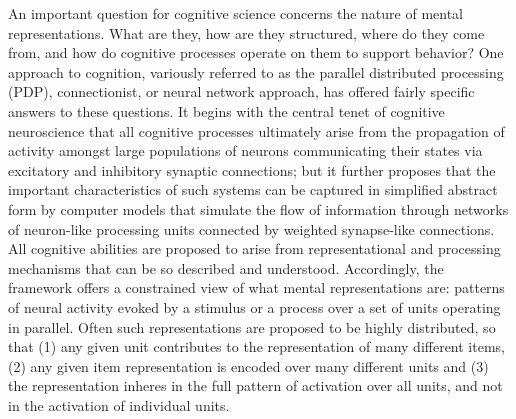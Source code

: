 An important question for cognitive science concerns the nature of mental representations. What are they, how are they structured, where do they come from, and how do cognitive processes operate on them to support behavior? One approach to cognition, variously referred to as the parallel distributed processing (PDP), connectionist, or neural network approach, has offered fairly specific answers to these questions. It begins with the central tenet of cognitive neuroscience that all cognitive processes ultimately arise from the propagation of activity amongst large populations of neurons communicating their states via excitatory and inhibitory synaptic connections; but it further proposes that the important characteristics of such systems can be captured in simplified abstract form by computer models that simulate the flow of information through networks of neuron-like processing units connected by weighted synapse-like connections. All cognitive abilities are proposed to arise from representational and processing mechanisms that can be so described and understood. Accordingly, the framework offers a constrained view of what mental representations are: patterns of neural activity evoked by a stimulus or a process over a set of units operating in parallel. Often such representations are proposed to be highly distributed, so that (1) any given unit contributes to the representation of many different items, (2) any given item representation is encoded over many different units and (3) the representation inheres in the full pattern of activation over all units, and not in the activation of individual units.

